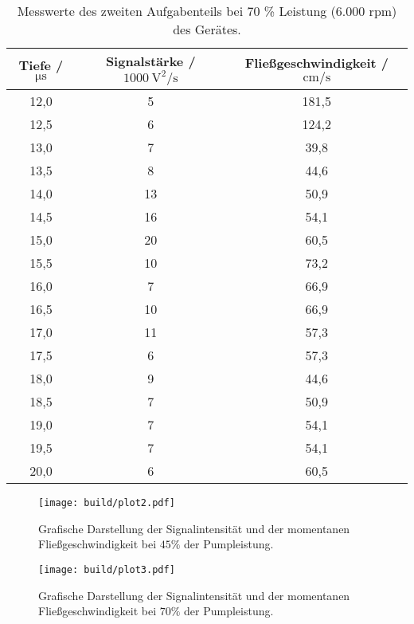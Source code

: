 \begin{table}[H]
  \centering
  \caption{Messwerte des zweiten Aufgabenteils bei 70 \% Leistung (6.000 rpm) des Gerätes.}
  \label{tab:Werte1}
  \begin{tabular}{c c c}
    \toprule
    Tiefe / $\si{\micro\second}$ & Signalstärke / $\SI{1000}{\square\volt\per\second}$ & Fließgeschwindigkeit / $\si{\centi\meter\per\second}$ \\
    \midrule
    12,0 & 5 & 181,5 \\
    12,5 & 6 & 124,2 \\
    13,0 & 7 & 39,8 \\
    13,5 & 8 & 44,6 \\
    14,0 & 13 & 50,9 \\
    14,5 & 16 & 54,1 \\
    15,0 & 20  & 60,5 \\
    15,5 & 10 & 73,2 \\
    16,0 & 7 & 66,9 \\
    16,5 & 10 & 66,9 \\
    17,0 & 11 & 57,3 \\
    17,5 & 6 & 57,3 \\
    18,0 & 9 & 44,6 \\
    18,5 & 7 & 50,9 \\
    19,0 & 7 & 54,1 \\
    19,5 & 7 & 54,1 \\
    20,0 & 6 & 60,5 \\
    \bottomrule
  \end{tabular}
\end{table}


\begin{figure}[H]
  \centering
  \texttt{[image: build/plot2.pdf]}
  \caption{Grafische Darstellung der Signalintensität und der momentanen Fließgeschwindigkeit bei $45\%$ der Pumpleistung.}
  \label{fig:plot2}
\end{figure}

\begin{figure}[H]
  \centering
  \texttt{[image: build/plot3.pdf]}
  \caption{Grafische Darstellung der Signalintensität und der momentanen Fließgeschwindigkeit bei $70\%$ der Pumpleistung.}
  \label{fig:plot3}
\end{figure}